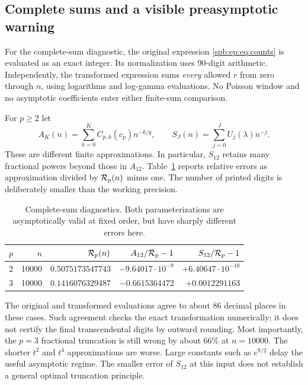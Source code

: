 \subsection{Complete sums and a visible preasymptotic warning}
\label{spb:ep:sec:numerics}
For the complete-sum diagnostic, the original expression
\eqref{spb:ep:eq:counts} is evaluated as an exact integer. Its normalization uses
90-digit arithmetic. Independently, the transformed expression sums
\emph{every} allowed $r$ from zero through $n$, using logarithms and
log-gamma evaluations. No Poisson window and no asymptotic coefficients
enter either finite-sum comparison.

For $p\ge2$ let
\[
 A_K(n)=\sum_{k=0}^K C_{p,k}(c_p)n^{-k/q},\qquad
 S_J(n)=\sum_{j=0}^J U_j(\lambda)n^{-j}.
\]
These are different finite approximations. In particular, $S_{12}$ retains
many fractional powers beyond those in $A_{12}$.
Table~\ref{spb:ep:tab:counts} reports relative errors as approximation divided by
$\mathcal R_p(n)$ minus one. The number of printed digits is deliberately smaller
than the working precision.

\begin{table}[htbp]
\centering\small
\begin{tabular}{@{}crrrr@{}}
\toprule
$p$ & $n$ & $\mathcal R_p(n)$ & $A_{12}/\mathcal R_p-1$ & $S_{12}/\mathcal R_p-1$\\
\midrule
2 & 10000 & $0.5075173547743$ & $-9.64017\cdot10^{-9}$ & $+6.40647\cdot10^{-10}$\\
3 & 10000 & $0.1416076329487$ & $-0.6615364472$ & $+0.0012291163$\\
\bottomrule
\end{tabular}
\caption{Complete-sum diagnostics. Both parameterizations are asymptotically
valid at fixed order, but have sharply different errors here.}
\label{spb:ep:tab:counts}
\end{table}

The original and transformed evaluations agree to about 86 decimal places
in these cases. Such agreement checks the exact transformation numerically;
it does not certify the final transcendental digits by outward rounding.
Most importantly, the $p=3$ fractional truncation is still wrong by about
$66\%$ at $n=10000$. The shorter $t^2$ and $t^4$ approximations are worse.
Large constants such as $e^{9/2}$ delay the useful asymptotic regime.
The smaller error of $S_{12}$ at this input does not establish a general
optimal truncation principle.

